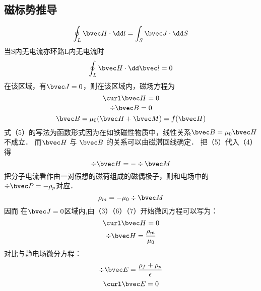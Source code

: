 
\subsection{磁标势推导}
\begin{equation}
\oint_L \bvec H \cdot \dd  l = \int_S \bvec J \cdot \dd S

\end{equation}当S内无电流亦环路L内无电流时
\begin{equation}
\oint_ L\bvec H \cdot \dd \bvec l = 0
\end{equation}
在该区域，有$\bvec J=0$，则在该区域内，磁场方程为 
\begin{equation}
\curl \bvec H =0
\end{equation}
\begin{equation}
\div \bvec B=0
\end{equation}
\begin{equation}
\bvec B=\mu_0(\bvec H+\bvec M)=f(\bvec H)
\end{equation}
式（5）的写法为函数形式因为在如铁磁性物质中，线性关系$\bvec B=\mu_0 \bvec H$不成立．
而$\bvec H$ 与 $\bvec B$ 的关系可以由磁滞回线确定．
把（5）代入（4）得
\begin{equation}
\div \bvec H= - \div \bvec M
\end{equation}
把分子电流看作由一对假想的磁荷组成的磁偶极子，则和电场中的$\div \bvec P=-\rho _p$对应．
\begin{equation}
\rho_m=-\mu_0 \div \bvec M
\end{equation}
因而 在$\bvec J=0$区域内,由（3）（6）（7）开始微风方程可以写为：
\begin{equation}
\curl \bvec H=0 
\end{equation}
\begin{equation}
\div \bvec H= \dfrac{\rho_m}{\mu_0}
\end{equation}
对比与静电场微分方程：
\begin{equation}
\div \bvec E=\dfrac{\rho_f+\rho_p}{\epsilon}
\end{equation}
\begin{equation}
\curl \bvec E=0
\end{equation}






